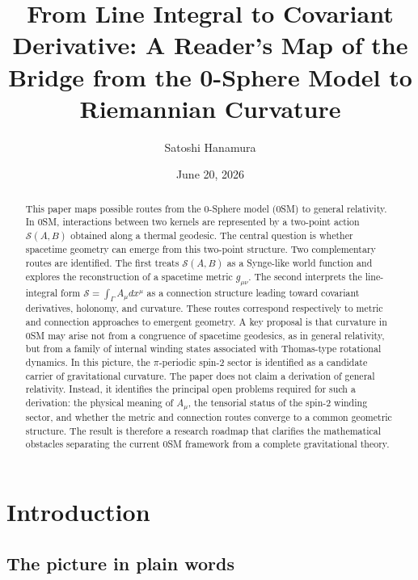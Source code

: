 \documentclass[%
 reprint, amsmath,amssymb, aps, prb, ]{revtex4-2}
\numberwithin{equation}{section}
\begin{document}
\title{From Line Integral to Covariant Derivative: A Reader's Map of the Bridge from the 0-Sphere Model to Riemannian Curvature}

\author{Satoshi Hanamura}

\date{June 20, 2026}

\begin{abstract}
This paper maps possible routes from the 0-Sphere model (0SM) to general relativity. In 0SM, interactions between two kernels are represented by a two-point action $\mathcal{S}(A,B)$ obtained along a thermal geodesic. The central question is whether spacetime geometry can emerge from this two-point structure. Two complementary routes are identified. The first treats $\mathcal{S}(A,B)$ as a Synge-like world function and explores the reconstruction of a spacetime metric $g_{\mu\nu}$. The second interprets the line-integral form $\mathcal{S}=\int_{\Gamma}A_{\mu}dx^{\mu}$ as a connection structure leading toward covariant derivatives, holonomy, and curvature. These routes correspond respectively to metric and connection approaches to emergent geometry. A key proposal is that curvature in 0SM may arise not from a congruence of spacetime geodesics, as in general relativity, but from a family of internal winding states associated with Thomas-type rotational dynamics. In this picture, the $\pi$-periodic spin-2 sector is identified as a candidate carrier of gravitational curvature. The paper does not claim a derivation of general relativity. Instead, it identifies the principal open problems required for such a derivation: the physical meaning of $A_{\mu}$, the tensorial status of the spin-2 winding sector, and whether the metric and connection routes converge to a common geometric structure. The result is therefore a research roadmap that clarifies the mathematical obstacles separating the current 0SM framework from a complete gravitational theory.
\end{abstract}

\maketitle

\section{Introduction}
\label{sec:intro}

\subsection{The picture in plain words}
\end{document}
